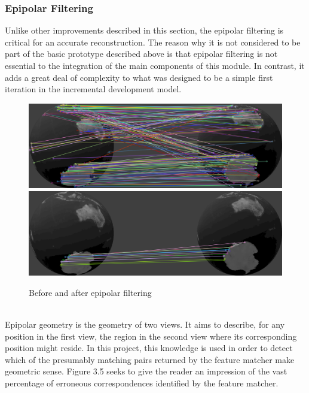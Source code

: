 \documentclass[12pt,a4paper,twoside,openright]{report}
\begin{document}
\subsubsection{Epipolar Filtering}
Unlike other improvements described in this section, the epipolar filtering is critical for an accurate reconstruction. The reason why it is not considered to be part of the basic prototype described above is that epipolar filtering is not essential to the integration of the main components of this module. In contrast, it adds a great deal of complexity to what was designed to be a simple first iteration in the incremental development model.\\
\begin{figure}
\begin{center}
\includegraphics[scale=0.35]{figs/before_epi.png} \\
\vspace{5pt}
\includegraphics[scale=0.35]{figs/after_epi.png}	
\caption{Before and after epipolar filtering}
\end{center}
\end{figure}\\
Epipolar geometry is the geometry of two views. It aims to describe, for any position in the first view, the region in the second view where its corresponding position might reside. In this project, this knowledge is used in order to detect which of the presumably matching pairs returned by the feature matcher make geometric sense. Figure 3.5 seeks to give the reader an impression of the vast percentage of erroneous correspondences identified by the feature matcher.\\
\end{document}
